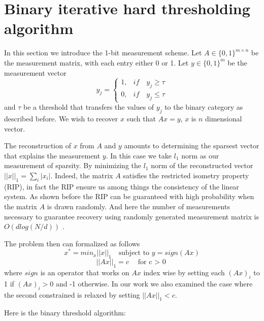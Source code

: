 \section{Binary iterative hard thresholding algorithm} 
In this section we introduce the 1-bit measurement scheme. Let $ A \in \{0,1\}^{m \times n} $ be the measurement matrix, with each entry either 0 or 1. Let $ y \in \{0,1\}^m $ be the measurement vector 
\begin{equation*}\label{key}
y_j = \begin{cases}
1, & if \quad y_j \geq \tau \\
0, & if \quad y_j \leq \tau 
\end{cases}
\end{equation*} 
and  $ \tau $ be a threshold that transfers the values of $ y_j$ to the binary category as described before. We wish to recover $ x $ such that $ Ax = y  $, $ x $ is $ n $ dimensional vector. 

The reconstruction of $ x $ from $ A $ and $ y $ amounts to determining the sparsest vector that explains the measurement $ y $. In this case we take $ l_1 $ norm as our measurement of sparsity. By minimizing the $ l_1 $ norm of the reconstructed vector $ ||x||_1  = \sum_{i}^{}|x_i|$. Indeed, the matrix $ A $ satisfies the restricted isometry property (RIP), in fact the RIP ensure us among things the consistency of the linear system. As shown before the RIP can be guaranteed with high probability when the matrix $ A $ is drawn randomly. And here the number of measurements necessary to guarantee recovery using randomly generated measurement matrix is $ O(dlog(N/d)) $ \cite{binary}. 

The problem then can formalized as follows \begin{equation}
x^* = min_x ||x||_1 \quad \text{subject to } y = sign(Ax) \end{equation}
\begin{equation*} ||Ax||_1 = c \quad \text{for c $>$ 0}
\end{equation*}  where $ sign $ is an operator that works on $ Ax $ index wise by setting each $(Ax)_i$ to 1 if $ (Ax)_i > 0$ and -1 otherwise. In our work we also examined the case where the second constrained is relaxed by setting  $ ||Ax||_1 < c $.  

Here is the binary threshold algorithm: 

